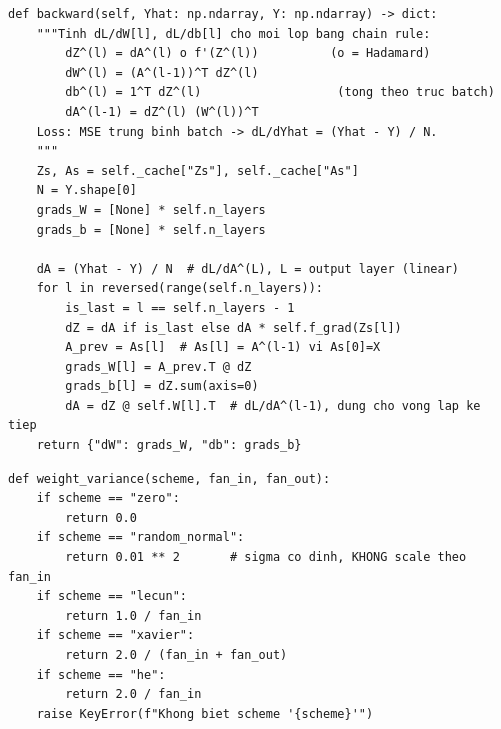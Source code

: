 \documentclass[12pt,a4paper]{article}
\begin{document}
\begin{lstlisting}[caption={Backward pass -- src/manual\_nn.py (nguyên văn công thức Mục~\ref{sec:matrixform})}]
def backward(self, Yhat: np.ndarray, Y: np.ndarray) -> dict:
    """Tinh dL/dW[l], dL/db[l] cho moi lop bang chain rule:
        dZ^(l) = dA^(l) o f'(Z^(l))          (o = Hadamard)
        dW^(l) = (A^(l-1))^T dZ^(l)
        db^(l) = 1^T dZ^(l)                   (tong theo truc batch)
        dA^(l-1) = dZ^(l) (W^(l))^T
    Loss: MSE trung binh batch -> dL/dYhat = (Yhat - Y) / N.
    """
    Zs, As = self._cache["Zs"], self._cache["As"]
    N = Y.shape[0]
    grads_W = [None] * self.n_layers
    grads_b = [None] * self.n_layers

    dA = (Yhat - Y) / N  # dL/dA^(L), L = output layer (linear)
    for l in reversed(range(self.n_layers)):
        is_last = l == self.n_layers - 1
        dZ = dA if is_last else dA * self.f_grad(Zs[l])
        A_prev = As[l]  # As[l] = A^(l-1) vi As[0]=X
        grads_W[l] = A_prev.T @ dZ
        grads_b[l] = dZ.sum(axis=0)
        dA = dZ @ self.W[l].T  # dL/dA^(l-1), dung cho vong lap ke tiep
    return {"dW": grads_W, "db": grads_b}
\end{lstlisting}

\begin{lstlisting}[caption={Cong thuc Var(W) cho tung scheme -- src/initialization.py (nguyên văn Bảng~\ref{tab:schemes})}]
def weight_variance(scheme, fan_in, fan_out):
    if scheme == "zero":
        return 0.0
    if scheme == "random_normal":
        return 0.01 ** 2       # sigma co dinh, KHONG scale theo fan_in
    if scheme == "lecun":
        return 1.0 / fan_in
    if scheme == "xavier":
        return 2.0 / (fan_in + fan_out)
    if scheme == "he":
        return 2.0 / fan_in
    raise KeyError(f"Khong biet scheme '{scheme}'")
\end{lstlisting}
\end{document}
